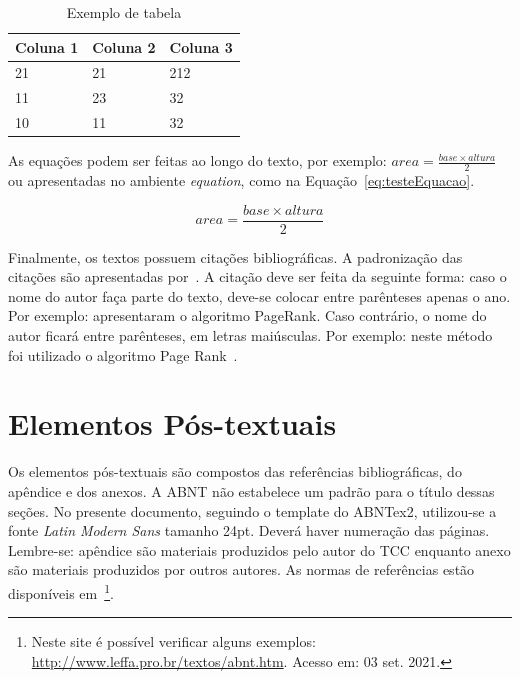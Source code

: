 \begin{table}[]
\centering
\caption{Exemplo de tabela}
\label{tab:exemploTabela}
\begin{tabular}{lll}
\toprule
Coluna 1                                              & Coluna 2            & Coluna 3 \\ \midrule
21		                                              & 21            		& 212 \\ 
11		                                              & 23            		& 32 \\ 
10		                                              & 11		            & 32 \\ \bottomrule
\end{tabular}
\end{table}

As equações podem ser feitas ao longo do texto, por exemplo: $area = \frac{base \times altura}{2}$ ou apresentadas no ambiente \textit{equation}, como na Equação~\ref{eq:testeEquacao}.

\begin{equation}
	area = \frac{base \times altura}{2}
    \label{eq:testeEquacao}
\end{equation}

Finalmente, os textos possuem citações bibliográficas. A padronização das citações são apresentadas por~. A citação deve ser feita da seguinte forma: caso o nome do autor faça parte do texto, deve-se colocar entre parênteses apenas o ano. Por exemplo:  apresentaram o algoritmo PageRank. Caso contrário, o nome do autor ficará entre parênteses, em letras maiúsculas. Por exemplo: neste método foi utilizado o algoritmo Page Rank~\cite{brin1998anatomy,abntCitacoes2002}.


\section{Elementos Pós-textuais}
\label{sec:posTextual}

Os elementos pós-textuais são compostos das referências bibliográficas, do apêndice e dos anexos. A ABNT não estabelece um padrão para o título dessas seções. No presente documento, seguindo o template do ABNTex2, utilizou-se a fonte \textit{Latin Modern Sans} tamanho 24pt. Deverá haver numeração das páginas. Lembre-se: apêndice são materiais produzidos pelo autor do TCC enquanto anexo são materiais produzidos por outros autores. 
As normas de referências estão disponíveis em~\footnote{Neste site é possível verificar alguns exemplos: \url{http://www.leffa.pro.br/textos/abnt.htm}. Acesso em: 03 set. 2021.}. 

